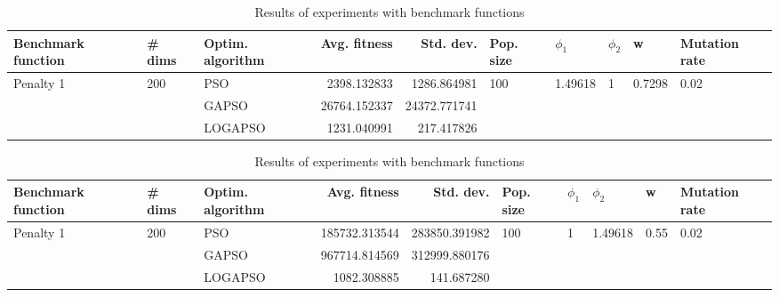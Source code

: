 \documentclass{article}
\begin{document}
\begin{table}
\centering
\caption{Results of experiments with benchmark functions}
\begin{tabular}{lllrrlllll}
\toprule
        Benchmark function &              \# dims & Optim. algorithm &  Avg. fitness &    Std. dev. &            Pop. size &               $\phi_{1}$ &         $\phi_{2}$ &                       w &         Mutation rate \\
\midrule
\multirow{3}{*}{Penalty 1} & \multirow{3}{*}{200} &              PSO &   2398.132833 &  1286.864981 & \multirow{3}{*}{100} & \multirow{3}{*}{1.49618} & \multirow{3}{*}{1} & \multirow{3}{*}{0.7298} & \multirow{3}{*}{0.02} \\
                           &                      &            GAPSO &  26764.152337 & 24372.771741 &                      &                          &                    &                         &                       \\
                           &                      &          LOGAPSO &   1231.040991 &   217.417826 &                      &                          &                    &                         &                       \\
\bottomrule
\end{tabular}
\end{table}
\begin{table}
\centering
\caption{Results of experiments with benchmark functions}
\begin{tabular}{lllrrlllll}
\toprule
        Benchmark function &              \# dims & Optim. algorithm &  Avg. fitness &     Std. dev. &            Pop. size &         $\phi_{1}$ &               $\phi_{2}$ &                     w &         Mutation rate \\
\midrule
\multirow{3}{*}{Penalty 1} & \multirow{3}{*}{200} &              PSO & 185732.313544 & 283850.391982 & \multirow{3}{*}{100} & \multirow{3}{*}{1} & \multirow{3}{*}{1.49618} & \multirow{3}{*}{0.55} & \multirow{3}{*}{0.02} \\
                           &                      &            GAPSO & 967714.814569 & 312999.880176 &                      &                    &                          &                       &                       \\
                           &                      &          LOGAPSO &   1082.308885 &    141.687280 &                      &                    &                          &                       &                       \\
\bottomrule
\end{tabular}
\end{table}
\end{document}

